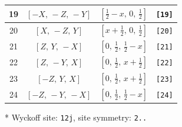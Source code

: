 \documentclass[fleqn,8pt]{jsarticle}
\begin{document}
\begin{longtable}{cccc}
19 & $\left[ - X,\, - Z,\, - Y \right]$ & $\left[ \frac{1}{2} - x,\, 0,\, \frac{1}{2} \right]$ & {\tt [19]} \\ \hline
20 & $\left[ X,\, - Z,\, Y \right]$ & $\left[ x + \frac{1}{2},\, 0,\, \frac{1}{2} \right]$ & {\tt [20]} \\ \hline
21 & $\left[ Z,\, Y,\, - X \right]$ & $\left[ 0,\, \frac{1}{2},\, \frac{1}{2} - x \right]$ & {\tt [21]} \\ \hline
22 & $\left[ Z,\, - Y,\, X \right]$ & $\left[ 0,\, \frac{1}{2},\, x + \frac{1}{2} \right]$ & {\tt [22]} \\ \hline
23 & $\left[ - Z,\, Y,\, X \right]$ & $\left[ 0,\, \frac{1}{2},\, x + \frac{1}{2} \right]$ & {\tt [23]} \\ \hline
24 & $\left[ - Z,\, - Y,\, - X \right]$ & $\left[ 0,\, \frac{1}{2},\, \frac{1}{2} - x \right]$ & {\tt [24]} \\
\end{longtable}
* Wyckoff site: {\tt 12j}, site symmetry: {\tt 2..}
\renewcommand{\arraystretch}{1.2}
\end{document}
